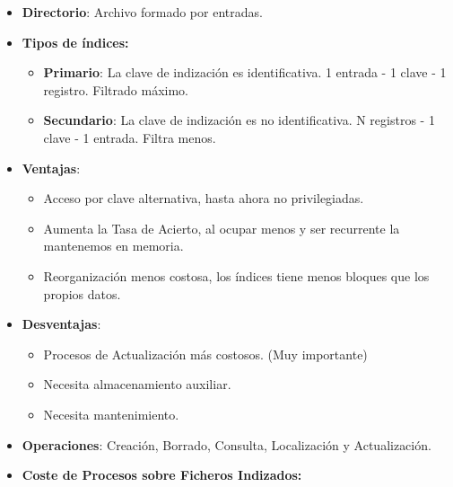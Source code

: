 \documentclass[12pt, twoside, openright]{report} %
\begin{document}
\begin{itemize}
\begin{itemize}
    \end{itemize}
  \item \textbf{Directorio}: Archivo formado por entradas.
    
  \item \textbf{Tipos de índices:}
    

    \begin{itemize}
    \item \textbf{Primario}: La clave de indización es identificativa. 1
      entrada - 1 clave - 1 registro. Filtrado máximo.
      
    \item \textbf{Secundario}: La clave de indización es no identificativa.
      N registros - 1 clave - 1 entrada. Filtra menos.
      
    \end{itemize}
  \item \textbf{Ventajas}:
    

    \begin{itemize}
    \item Acceso por clave alternativa, hasta ahora no privilegiadas.
      
    \item Aumenta la Tasa de Acierto, al ocupar menos y ser recurrente la
      mantenemos en memoria.
      
    \item Reorganización menos costosa, los índices tiene menos bloques que
      los propios datos.
      
    \end{itemize}
	\pagebreak
  \item \textbf{Desventajas}:
    

    \begin{itemize}
    \item Procesos de Actualización más costosos. (Muy importante)
      
    \item Necesita almacenamiento auxiliar.
      
    \item Necesita mantenimiento.
      
    \end{itemize}
  \item \textbf{Operaciones}: Creación, Borrado, Consulta, Localización y
    Actualización.
    
  \item \textbf{Coste de Procesos sobre Ficheros Indizados:}
    


\end{itemize}
\end{document}
